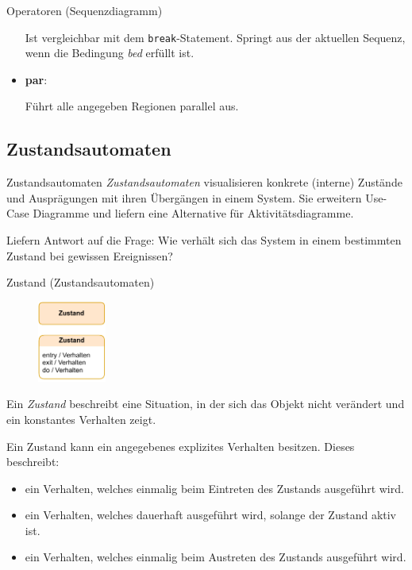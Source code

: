 \begin{diag}{Operatoren (Sequenzdiagramm)}
\begin{itemize}
              Ist vergleichbar mit dem \texttt{break}-Statement.
              Springt aus der aktuellen Sequenz, wenn die Bedingung \emph{bed} erfüllt ist.
        \item \textbf{par}:

              Führt alle angegeben Regionen parallel aus.
    \end{itemize}
\end{diag}

\subsection{Zustandsautomaten}

\begin{defi}{Zustandsautomaten}
    \emph{Zustandsautomaten} visualisieren konkrete (interne) Zustände und Ausprägungen mit ihren Übergängen in einem System.
    Sie erweitern Use-Case Diagramme und liefern eine Alternative für Aktivitätsdiagramme.

    Liefern Antwort auf die Frage:
    Wie verhält sich das System in einem bestimmten Zustand bei gewissen Ereignissen?
\end{defi}

\begin{diag}{Zustand (Zustandsautomaten)}
    \begin{figure}
        \centering
        \includegraphics[width=0.2\textwidth]{includes/figures/defi_diagrams_state.pdf}
    \end{figure}
    Ein \emph{Zustand} beschreibt eine Situation, in der sich das Objekt nicht verändert und ein konstantes Verhalten zeigt.

    Ein Zustand kann ein angegebenes explizites Verhalten besitzen.
    Dieses beschreibt:
    \begin{itemize}
        \item ein Verhalten, welches einmalig beim Eintreten des Zustands ausgeführt wird.
        \item ein Verhalten, welches dauerhaft ausgeführt wird, solange der Zustand aktiv ist.
        \item ein Verhalten, welches einmalig beim Austreten des Zustands ausgeführt wird.
    \end{itemize}
\end{diag}

